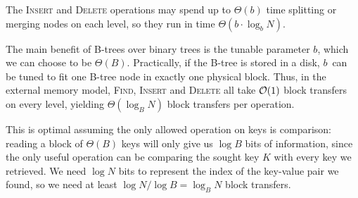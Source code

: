 The \textsc{Insert} and \textsc{Delete} operations may spend up to
$\Theta(b)$ time splitting or merging nodes on each level, so they run in
time $\Theta(b \cdot \log_b N)$.

The main benefit of B-trees over binary trees is the tunable parameter
$b$, which we can choose to be $\Theta(B)$. Practically, if the B-tree
is stored in a disk, $b$~can be tuned to fit one B-tree node in exactly one
physical block. Thus, in the external memory model, \textsc{Find},
\textsc{Insert} and \textsc{Delete} all take $\mathcal{O}(1)$ block transfers
on every level, yielding $\Theta(\log_B N)$ block transfers per operation.

This is optimal assuming the only allowed operation
on keys is comparison: reading a block of $\Theta(B)$ keys will only
give us $\log B$ bits of information, since the only useful operation
can be comparing the sought key $K$ with every key we retrieved.
We need $\log N$ bits to represent the index of the key-value pair we found,
so we need at least $\log N/\log B=\log_B N$ block transfers.

